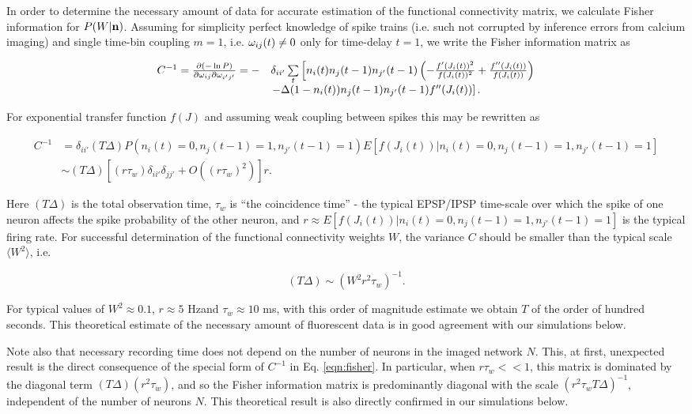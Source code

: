 In order to determine the necessary amount of data for accurate estimation of the functional connectivity matrix, we calculate Fisher information for $P(W|{\bf n})$. Assuming for simplicity perfect knowledge of spike trains (i.e. such not corrupted by inference errors from calcium imaging) and single time-bin coupling $m=1$, i.e. $\omega_{ij}(t)\neq 0$ only for time-delay $t=1$, we write the Fisher information matrix as

\begin{equation}
\begin{array}{rl}
C^{-1}=\frac{\partial (-\ln P)}{\partial \omega_{ij}\partial \omega_{i'j'}}
=-&\delta_{ii'}\sum\limits_t\left[
n_i(t)n_{j}(t-1)n_{j'}(t-1)\left(-\frac{f'(J_i(t))^2}{f(J_i(t))^2} +
\frac{f''(J_i(t))}{f(J_i(t))}\right) \right. \\
&\left.-\Delta (1-n_i(t))n_{j}(t-1)n_{j'}(t-1)f''(J_i(t))\right].
\end{array}
\end{equation}

For exponential transfer function $f(J)$ and assuming weak coupling between spikes this may be rewritten as

\begin{equation}\label{eqn:fisher}
\begin{array}{rl}
C^{-1}
&=\delta_{ii'} (T\Delta) P(n_i(t)=0, n_j(t-1)=1, n_{j'}(t-1)=1)E[f(J_i(t))|n_i(t)=0, n_j(t-1)=1, n_{j'}(t-1)=1] \\
&\sim (T\Delta)\left[(r \tau_w)\delta_{ii'}\delta_{jj'}+O((r \tau_w)^2)\right]r.
\end{array}
\end{equation}

Here $(T\Delta)$ is the total observation time, $ \tau_w$ is ``the coincidence time'' - the typical EPSP/IPSP time-scale over which the spike of one neuron affects the spike probability of the other neuron, and $r \approx E[f(J_i(t))|n_i(t)=0, n_j(t-1)=1, n_{j'}(t-1)=1]$ is the typical firing rate.  For successful determination of the functional connectivity weights $W$, the variance $C$ should be smaller than the typical scale $\langle W^2\rangle$, i.e.

\begin{equation}
(T\Delta) \sim (W^2 r^2  \tau_w)^{-1}.
\end{equation}

For typical values of $W^2\approx 0.1$, $r\approx 5$  Hzand $ \tau_w \approx 10$ ms, 
with this order of magnitude estimate we obtain $T$ of the order of hundred seconds.
This theoretical estimate of the necessary amount of fluorescent data is in good agreement with our simulations below.

Note also that necessary recording time does not depend on the number of neurons in the imaged network $N$. This, at first, unexpected result is the direct consequence of the special form of $C^{-1}$ in Eq. \eqref{eqn:fisher}. In particular, when $r \tau_w <<1$, this matrix is dominated by the diagonal term $(T\Delta)(r^2  \tau_w)$, and so the Fisher information matrix is predominantly diagonal with the scale $(r^2 \tau_w T\Delta)^{-1}$, independent of the number of neurons $N$. This theoretical result is also directly confirmed in our simulations below.
